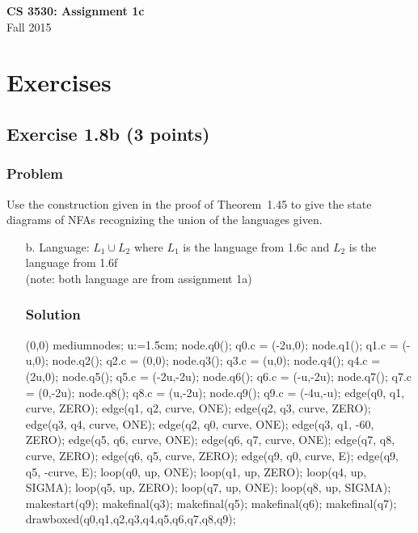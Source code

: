 \documentclass{article}
\begin{document}
\begin{empfile}

\begin{center}
\textbf{\Large CS 3530: Assignment 1c} \\[2mm]
Fall 2015
\end{center}

\raggedright

\section*{Exercises}

\subsection*{Exercise 1.8b (3 points)}

\subsubsection*{Problem}

Use the construction given in the proof of Theorem~1.45 to give the
state diagrams of NFAs recognizing the union of the languages given.

\begin{itemize}
\item[b.] Language: $L_1\cup L_2$ where $L_1$ is the language from
1.6c and $L_2$ is the language from 1.6f \\ (note: both language are
from assignment 1a)

\subsubsection*{Solution}

	\begin{center}
	\begin{emp}(0,0)
	mediumnodes;
	u:=1.5cm;
	node.q0(); q0.c = (-2u,0);
	node.q1(); q1.c = (-u,0);
	node.q2(); q2.c = (0,0);
	node.q3(); q3.c = (u,0);
	node.q4(); q4.c = (2u,0);
	node.q5(); q5.c = (-2u,-2u);
	node.q6(); q6.c = (-u,-2u);
	node.q7(); q7.c = (0,-2u);
	node.q8(); q8.c = (u,-2u);
	node.q9(); q9.c = (-4u,-u);
	edge(q0, q1, curve, ZERO);
	edge(q1, q2, curve, ONE);
	edge(q2, q3, curve, ZERO);
	edge(q3, q4, curve, ONE);
	edge(q2, q0, curve, ONE);
	edge(q3, q1, -60, ZERO);
	edge(q5, q6, curve, ONE);
	edge(q6, q7, curve, ONE);
	edge(q7, q8, curve, ZERO);
	edge(q6, q5, curve, ZERO);
	edge(q9, q0, curve, E);
	edge(q9, q5, -curve, E);
	loop(q0, up, ONE);
	loop(q1, up, ZERO);
	loop(q4, up, SIGMA);
	loop(q5, up, ZERO);
	loop(q7, up, ONE);
	loop(q8, up, SIGMA);
	makestart(q9);
	makefinal(q3);
	makefinal(q5);
	makefinal(q6);
	makefinal(q7);
	drawboxed(q0,q1,q2,q3,q4,q5,q6,q7,q8,q9);
	\end{emp}
	\end{center}


\end{itemize}
\end{empfile}
\end{document}
